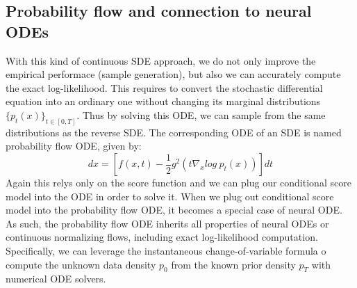 \documentclass{article}
\begin{document}
	 \subsection{Probability flow and connection to neural ODEs}
	 With this kind of continuous SDE approach, we do not only improve the empirical performace (sample generation), but also we can accurately compute the exact log-likelihood. This requires to convert the stochastic differential equation into an ordinary one without changing its marginal distributions $\{p_{t}(x)\}_{t \in [0,T]}$. Thus by solving this ODE, we can sample from the same distributions as the reverse SDE. The corresponding ODE of an SDE is named probability flow ODE, given by:
	 \begin{equation}
	 dx=[f(x,t) - \frac{1}{2} g^2(t \nabla_{x}log\ p_{t}(x))]dt
	 \end{equation}
Again this relys only on the score function and we can plug our conditional score model into the ODE in order to solve it. When we plug out conditional score model into the probability flow ODE, it becomes a special case of neural ODE. As such, the probability flow ODE inherits all properties of neural ODEs or continuous normalizing flows, including exact log-likelihood computation. Specifically, we can leverage the instantaneous change-of-variable formula o compute the unknown data density $p_{0}$ from the known prior density $p_{T}$ with numerical ODE solvers.
\end{document}
